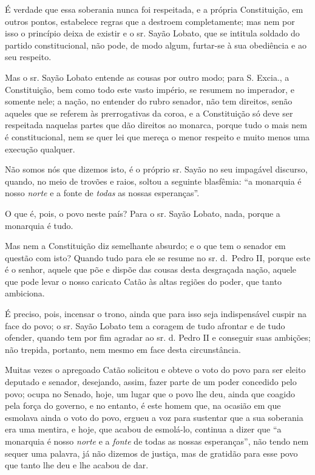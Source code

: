 É verdade que essa soberania nunca foi respeitada, e a própria
Constituição, em outros pontos, estabelece regras que a destroem
completamente; mas nem por isso o princípio deixa de existir e o sr.
Sayão Lobato, que se intitula soldado do partido constitucional, não
pode, de modo algum, furtar-se à sua obediência e ao seu respeito.

Mas o sr. Sayão Lobato entende as cousas por outro modo; para S. Excia.,
a Constituição, bem como todo este vasto império, se resumem no
imperador, e somente nele; a nação, no entender do rubro senador, não
tem direitos, senão aqueles que se referem às prerrogativas da coroa, e
a Constituição só deve ser respeitada naquelas partes que dão direitos
ao monarca, porque tudo o mais nem é constitucional, nem se quer lei que
mereça o menor respeito e muito menos uma execução qualquer.

Não somos nós que dizemos isto, é o próprio sr. Sayão no seu impagável
discurso, quando, no meio de trovões e raios, soltou a seguinte
blasfêmia: ``a monarquia é nosso \emph{norte} e a fonte de \emph{todas}
as nossas esperanças''.

O que é, pois, o povo neste país? Para o sr. Sayão Lobato, nada, porque
a monarquia é tudo.

Mas nem a Constituição diz semelhante absurdo; e o que tem o senador em
questão com isto? Quando tudo para ele se resume no sr. d.~Pedro II,
porque este é o senhor, aquele que põe e dispõe das cousas desta
desgraçada nação, aquele que pode levar o nosso caricato Catão às altas
regiões do poder, que tanto ambiciona.

É preciso, pois, incensar o trono, ainda que para isso seja
indispensável cuspir na face do povo; o sr. Sayão Lobato tem a coragem
de tudo afrontar e de tudo ofender, quando tem por fim agradar ao sr. d.
Pedro II e conseguir suas ambições; não trepida, portanto, nem mesmo em
face desta circunstância.

Muitas vezes o apregoado Catão solicitou e obteve o voto do povo para
ser eleito deputado e senador, desejando, assim, fazer parte de um poder
concedido pelo povo; ocupa no Senado, hoje, um lugar que o povo lhe deu,
ainda que coagido pela força do governo, e no entanto, é este homem que,
na ocasião em que esmolava ainda o voto do povo, ergueu a voz para
sustentar que a sua soberania era uma mentira, e hoje, que acabou de
esmolá-lo, continua a dizer que ``a monarquia é nosso \emph{norte} e a
\emph{fonte} de todas as nossas esperanças'', não tendo nem sequer uma
palavra, já não dizemos de justiça, mas de gratidão para esse povo que
tanto lhe deu e lhe acabou de dar.

